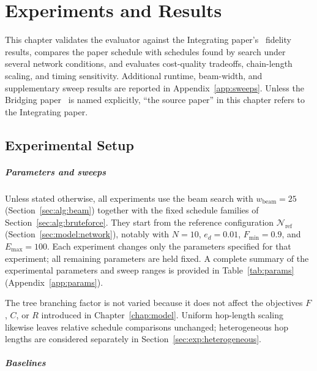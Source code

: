 \chapter{Experiments and Results}
\label{chap:results}


This chapter validates the evaluator against the Integrating paper's~\cite{Benchasattabuse2025Integrating} fidelity results, compares the paper schedule with schedules found by search under several network conditions, and evaluates cost-quality tradeoffs, chain-length scaling, and timing sensitivity. Additional runtime, beam-width, and supplementary sweep results are reported in Appendix~\ref{app:sweeps}. Unless the Bridging paper~\cite{Benchasattabuse2026Bridging} is named explicitly, ``the source paper'' in this chapter refers to the Integrating paper.

\section{Experimental Setup}
\label{sec:exp:setup}

\paragraph{Parameters and sweeps}
\label{sec:exp:params}

Unless stated otherwise, all experiments use the beam search with $w_{\text{beam}}=25$ (Section~\ref{sec:alg:beam}) together with the fixed schedule families of Section~\ref{sec:alg:bruteforce}. They start from the reference configuration $\mathcal{N}_{\mathrm{ref}}$ (Section~\ref{sec:model:network}), notably with $N=10$, $e_d=0.01$, $F_{\min}=0.9$, and $E_{\max}=100$. Each experiment changes only the parameters specified for that experiment; all remaining parameters are held fixed. A complete summary of the experimental parameters and sweep ranges is provided in Table~\ref{tab:params} (Appendix~\ref{app:params}).

The tree branching factor is not varied because it does not affect the objectives $F$, $C$, or $R$ introduced in Chapter~\ref{chap:model}. Uniform hop-length scaling likewise leaves relative schedule comparisons unchanged; heterogeneous hop lengths are considered separately in Section~\ref{sec:exp:heterogeneous}.

\paragraph{Baselines}
\label{sec:exp:baselines}

